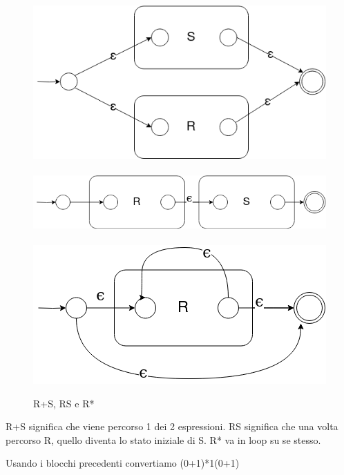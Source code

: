 \documentclass[12pt]{article}
\begin{document}
	\begin{figure}[ht]
		\includegraphics[scale = 0.4]{media/RS.png} \\ \\
		\includegraphics[scale = 0.4]{media/RSmult.png} \\ \\
		\includegraphics[scale = 0.4]{media/RSstar.png}
		\centering
		\caption{R+S, RS e R*}
	\end{figure}

	R+S significa che viene percorso 1 dei 2 espressioni. RS significa che una volta percorso R, quello diventa lo stato iniziale di S. R* va in loop su se stesso.

	\newpage
	Usando i blocchi precedenti convertiamo (0+1)*1(0+1)
\end{document}
